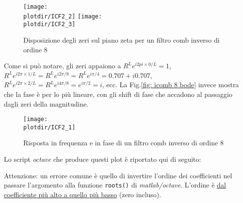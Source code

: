 \begin{figure}[htbp]
	\begin{center}
		\texttt{[image: \\plotdir/ICF2\_2]}
	  \texttt{[image: \\plotdir/ICF2\_3]}
		\caption{Disposizione degli zeri sul piano zeta per un filtro comb inverso di ordine 8\label{fig: icomb 8 zeroes}}
	\end{center}
\end{figure}

Come si pu\`o notare, gli zeri appaiono a $R^{L} e^{i 2 pi \times 0/L} = 1$,
$R^{L} e^{i 2 \pi \times 1/L} = R^{L} e^{i 2 \pi / 8} = R^{L} e^{i \pi / 4} = 0.707 + i 0.707$,
$R^{L} e^{i 2 \pi \times 2 /L} = R^{L} e^{i 4 \pi / 8} = e^{i \pi /2} = i$, ecc.
La Fig.\vref{fig: icomb 8 bode} invece mostra che la fase \`e per lo pi\`u
lineare, con gli shift di fase che accadono al passaggio dagli zeri della
magnitudine.

\begin{figure}[htbp]
	\begin{center}
	  \texttt{[image: \\plotdir/ICF2\_1]}
	  \caption{Risposta in frequenza e in fase di un filtro comb inverso di ordine 8\label{fig: icomb 8 bode}}
	\end{center}
\end{figure}

Lo script \emph{octave} che produce questi plot \`e riportato qui di seguito:


Attenzione: un errore comune \`e quello di invertire l'ordine dei coefficienti nel
passare l'argomento alla funzione {\tt roots()} di \emph{matlab/octave}.
L'ordine \`e \ul{dal coefficiente pi\`u alto a quello pi\`u basso} (zero
incluso).

